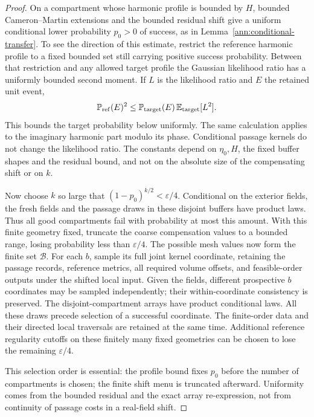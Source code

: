 \documentclass[11pt]{article}
\numberwithin{equation}{section}
\theoremstyle{definition}
\theoremstyle{remark}
\newcommand{\1}{\mathbf 1}
\begin{document}
\begin{proof}
On a compartment whose harmonic profile is bounded by $H$, bounded
Cameron--Martin extensions and the bounded residual shift give a
uniform conditional lower probability $p_0>0$ of success, as in
Lemma~\ref{ann:conditional-transfer}.  To see the
direction of this estimate, restrict the reference harmonic profile
to a fixed bounded set still carrying positive success probability.
Between that restriction and any allowed target profile the Gaussian
likelihood ratio has a uniformly bounded second moment.  If $L$ is
the likelihood ratio and $E$ the retained unit event,
\[
 \mathbb P_{\rm ref}(E)^2
 \leq \mathbb P_{\rm target}(E)\,
       \mathbb E_{\rm target}[L^2].
\]
This bounds the target probability below uniformly.  The same
calculation applies to the imaginary harmonic part modulo its phase.
Conditional passage kernels do not change the likelihood ratio.
The constants depend on $\eta_0,H$, the fixed buffer shapes and the
residual bound, and not on the absolute size of the compensating
shift or on $k$.

Now choose $k$ so large that $(1-p_0)^{k/2}<\varepsilon/4$.
Conditional on the exterior fields, the fresh fields and the passage
draws in these disjoint buffers have product laws.  Thus all good
compartments fail with probability at most this amount.  With this
finite geometry fixed, truncate the coarse compensation values to a
bounded range, losing probability less than $\varepsilon/4$.
The possible mesh values now form the finite set $\mathcal B$.
For each $b$, sample its full joint kernel coordinate, retaining the
passage records, reference metrics, all required volume offsets, and
feasible-order outputs under the shifted local input.  Given the
fields, different prospective $b$ coordinates may be sampled
independently; their within-coordinate consistency is preserved.
The disjoint-compartment arrays have product conditional laws.
All these draws precede selection of a successful coordinate.
The finite-order data and their directed local traversals are
retained at the same time.  Additional reference
regularity cutoffs on these finitely many fixed geometries can be
chosen to lose the remaining $\varepsilon/4$.

This selection order is essential: the profile bound fixes $p_0$
before the number of compartments is chosen; the finite shift menu is
truncated afterward.  Uniformity comes from the bounded residual and
the exact array re-expression, not from continuity of passage costs
in a real-field shift.
\end{proof}
\end{document}

